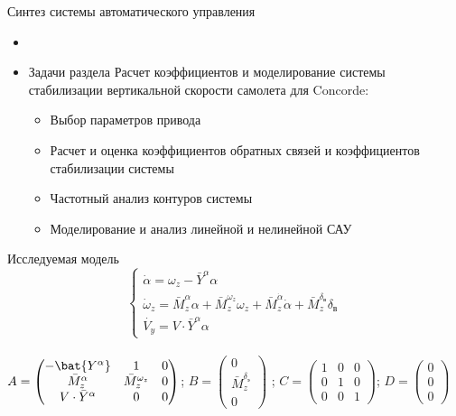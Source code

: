 \begin{frame}{Синтез системы автоматического управления}
    \begin{itemize}
        \item <+-> []
        \item <+-> []  \begin{block}{Задачи раздела}
                Расчет коэффициентов и моделирование системы стабилизации вертикальной скорости самолета для Concorde: 
            \begin{itemize}
                \item Выбор параметров привода 
                \item Расчет и оценка коэффициентов обратных связей и коэффициентов стабилизации системы
                \item Частотный анализ контуров системы 
                \item Моделирование и анализ линейной и нелинейной САУ
            \end{itemize}
        \end{block}
    \end{itemize}
\end{frame}

\begin{frame}{Исследуемая модель} %
    $$ \begin{cases}
            \dot{\alpha}=\omega_z-\bar{Y}^{\alpha} \alpha \\
            \dot{\omega}_z=\bar{M}_z^{\alpha} \alpha+\bar{M}_z^{\omega_z} \omega_z +\bar{M}_z^{\dot{\alpha}} \dot{\alpha}+\bar{M}_z^{\delta_{\text{в}}} \delta_{\text{в}} \\
            \dot{V_y}=V \cdot \bar{Y}^{\alpha} \alpha
    \end{cases} $$ \\
    $A = \begin{pmatrix}
        -\bat{Y^{\alpha}} & 1 & 0\\ 
        \bar{M}_z^\alpha & \bar{M}_z^{\omega_z} & 0\\ 
         V \cdot \bar{Y}^\alpha& 0 & 0 
    \end{pmatrix}$;
    $B = \begin{pmatrix}
     0 \\ 
     \bar{M}_z^{\delta_{\text{э}}} \\ 
     0 
    \end{pmatrix}$ ;
    $C= \begin{pmatrix}
    1 & 0 & 0\\ 
    0 & 1 & 0\\ 
     0& 0 &1 
    \end{pmatrix}$;
    $D = \begin{pmatrix}
     0 \\ 
     0 \\ 
     0 
    \end{pmatrix}$
\end{frame}

